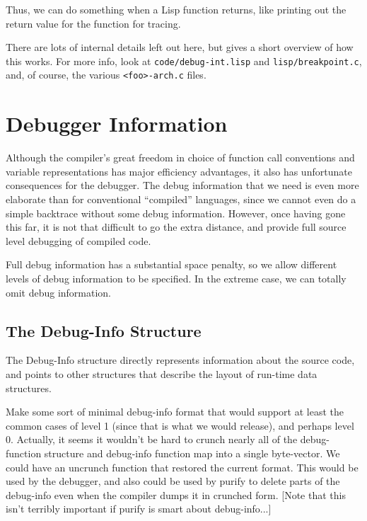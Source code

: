 Thus, we can do something when a Lisp function returns, like printing
out the return value for the function for tracing.

There are lots of internal details left out here, but gives a short
overview of how this works.  For more info, look at
\verb+code/debug-int.lisp+ and \verb+lisp/breakpoint.c+, and, of
course, the various \verb+<foo>-arch.c+ files.

\chapter{Debugger Information}
\label{debug-info}

Although the compiler's great freedom in choice of function call conventions
and variable representations has major efficiency advantages, it also has
unfortunate consequences for the debugger.  The debug information that we need
is even more elaborate than for conventional ``compiled'' languages, since we
cannot even do a simple backtrace without some debug information.  However,
once having gone this far, it is not that difficult to go the extra distance,
and provide full source level debugging of compiled code.

Full debug information has a substantial space penalty, so we allow different
levels of debug information to be specified.  In the extreme case, we can
totally omit debug information.


\section{The Debug-Info Structure}

The Debug-Info structure directly represents information about the
source code, and points to other structures that describe the layout of
run-time data structures.


Make some sort of minimal debug-info format that would support at least the
common cases of level 1 (since that is what we would release), and perhaps
level 0.  Actually, it seems it wouldn't be hard to crunch nearly all of the
debug-function structure and debug-info function map into a single byte-vector.
We could have an uncrunch function that restored the current format.  This
would be used by the debugger, and also could be used by purify to delete parts
of the debug-info even when the compiler dumps it in crunched form.
[Note that this isn't terribly important if purify is smart about
debug-info...]


